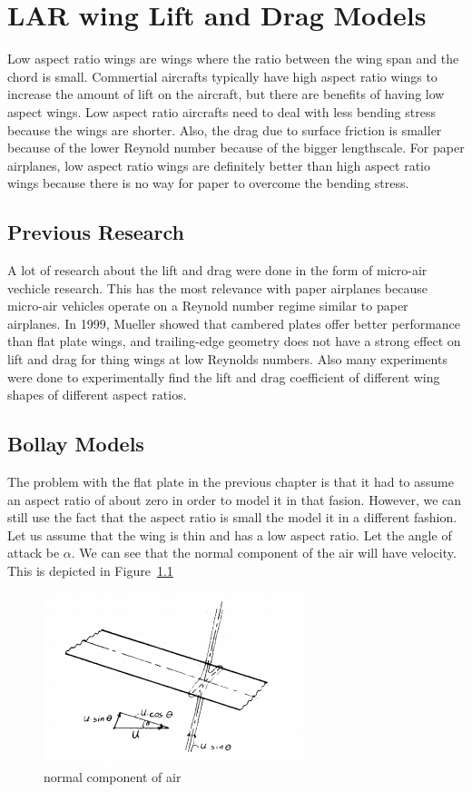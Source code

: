 
\chapter{LAR wing Lift and Drag Models}

Low aspect ratio wings are wings where the ratio between the wing span and
the chord is small. Commertial aircrafts typically have high aspect ratio wings
to increase the amount of lift on the aircraft, but there are benefits of having
low aspect wings. Low aspect ratio aircrafts need to deal with less bending
stress because the wings are shorter. Also, the drag due to surface friction is
smaller because of the lower Reynold number because of the bigger lengthscale.
For paper airplanes, low aspect ratio wings are definitely better than high
aspect ratio wings because there is no way for paper to overcome the
bending stress.


\section{Previous Research}

A lot of research about the lift and drag  were done in the form of
micro-air vechicle research. This has the most relevance with paper airplanes because
micro-air vehicles operate on a Reynold number regime similar to paper airplanes. 
In 1999, Mueller showed that cambered plates offer better performance than flat plate wings, and
trailing-edge geometry does not have a strong effect on lift and drag
for thing wings at low Reynolds numbers. Also many experiments were done to experimentally
find the lift and drag coefficient of different wing shapes of different aspect ratios.

\section{Bollay Models}

The problem with the flat plate in the previous chapter is that it had to assume 
an aspect ratio of about zero in order to model it in that fasion. However, we can still
use the fact that the aspect ratio is small the model it in a different fashion.
Let us assume that the wing is thin and has a low aspect ratio. Let the angle of attack
 be $\alpha$. We can see that the normal component of the air
will have velocity. This is depicted in Figure~\ref{fig:bollay1}

\begin{figure}[hl]
  \centering
    \includegraphics[scale=1]{figures/bollay1.png}
    \caption{normal component of air}
  \label{fig:bollay1}
\end{figure}


